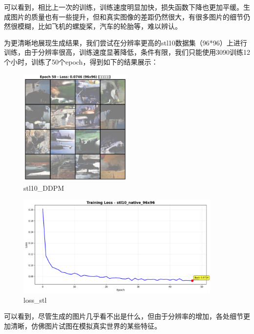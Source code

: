 \documentclass{ctexart}
\begin{document}
\noindent
可以看到，相比上一次的训练，训练速度明显加快，损失函数下降也更加平缓。生成图片的质量也有一些提升，但和真实图像的差距仍然很大，有很多图片的细节仍然很模糊，比如飞机的螺旋桨，汽车的轮胎等，难以辨认。

\noindent
为更清晰地展现生成结果，我们尝试在分辨率更高的stl10数据集（96*96）上进行训练，由于分辨率很高，训练速度显著降低，条件有限，我们只能使用3090训练12个小时，训练了50个epoch，得到如下的结果展示：
\begin{figure}[H]
     \centering
     \includegraphics[width=0.5\textwidth]{epoch_50_samples_stl.png}
     \caption{stl10\_DDPM}
     \label{fig:stl10_ddpm}  %
\end{figure}

\begin{figure}[H]
     \centering
     \includegraphics[width=0.9\textwidth]{loss_stl.png}
     \caption{loss\_stl}
     \label{fig:loss_stl}  %
\end{figure}

\noindent
可以看到，尽管生成的图片几乎看不出是什么，但由于分辨率的增加，各处细节更加清晰，仿佛图片试图在模拟真实世界的某些特征。
\end{document}
